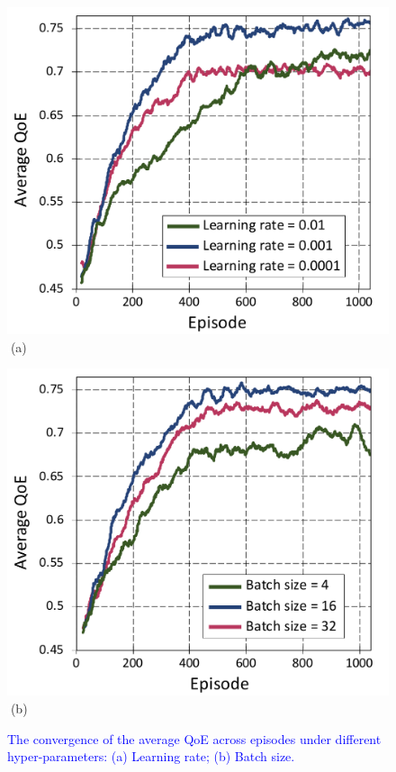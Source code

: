 \documentclass[10pt, journal,letterpaper]{IEEEtran}
\begin{document}
\begin{figure}
	\captionsetup{name=Fig.}
	\begin{minipage}[b]{0.5\linewidth}
		\centering
		\includegraphics[width=\textwidth]{ m2} 
		\textcolor{white}{i}\hspace{0.6cm}(a)
	\end{minipage}
	\hspace{-0.26cm}
	\begin{minipage}[b]{0.5\linewidth}
		\centering
		\includegraphics[width=\textwidth]{ m3}
		\textcolor{white}{i}\hspace{0.6cm}(b)
	\end{minipage}
	\vspace{-0.65cm}
	\caption{\textcolor{blue}{The convergence of the average QoE across episodes under different hyper-parameters: (a) Learning rate; (b) Batch size.}}
	\label{chart02}
\end{figure}
\end{document}

